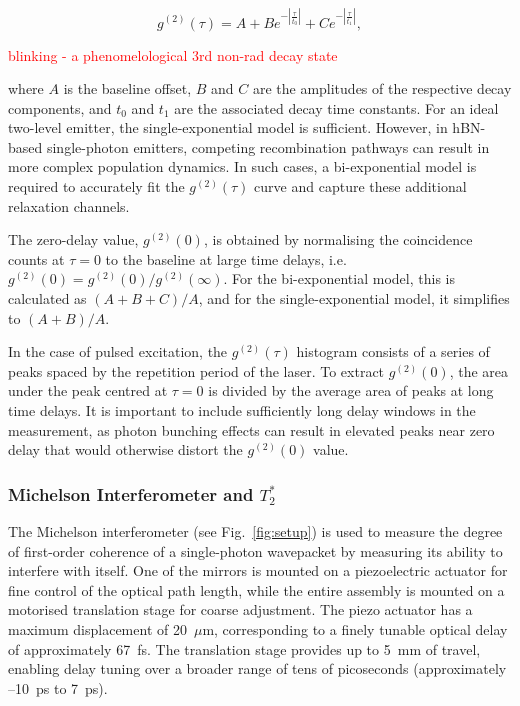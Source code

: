 \begin{equation}
    g^{(2)}(\tau) = A + B e^{-\left| \frac{\tau}{t_0} \right|} + C e^{-\left| \frac{\tau}{t_1} \right|},
    \label{eqn:bi-decay-g2}
\end{equation}

\textcolor{red}{blinking - a phenomelological 3rd non-rad decay state}

where $A$ is the baseline offset, $B$ and $C$ are the amplitudes of the respective decay components, and $t_0$ and $t_1$ are the associated decay time constants. For an ideal two-level emitter, the single-exponential model is sufficient. However, in hBN-based single-photon emitters, competing recombination pathways can result in more complex population dynamics. In such cases, a bi-exponential model is required to accurately fit the $g^{(2)}(\tau)$ curve and capture these additional relaxation channels.

The zero-delay value, $g^{(2)}(0)$, is obtained by normalising the coincidence counts at $\tau = 0$ to the baseline at large time delays, i.e. $g^{(2)}(0) = g^{(2)}(0)/g^{(2)}(\infty)$. For the bi-exponential model, this is calculated as $(A + B + C)/A$, and for the single-exponential model, it simplifies to $(A + B)/A$.

In the case of pulsed excitation, the $g^{(2)}(\tau)$ histogram consists of a series of peaks spaced by the repetition period of the laser. To extract $g^{(2)}(0)$, the area under the peak centred at $\tau = 0$ is divided by the average area of peaks at long time delays. It is important to include sufficiently long delay windows in the measurement, as photon bunching effects can result in elevated peaks near zero delay that would otherwise distort the $g^{(2)}(0)$ value.

\subsubsection{Michelson Interferometer and $T_2^*$}

The Michelson interferometer (see Fig.~\ref{fig:setup}) is used to measure the degree of first-order coherence of a single-photon wavepacket by measuring its ability to interfere with itself. One of the mirrors is mounted on a piezoelectric actuator for fine control of the optical path length, while the entire assembly is mounted on a motorised translation stage for coarse adjustment. The piezo actuator has a maximum displacement of 20~$\mu$m, corresponding to a finely tunable optical delay of approximately 67~fs. The translation stage provides up to 5~mm of travel, enabling delay tuning over a broader range of tens of picoseconds (approximately --10~ps to 7~ps).

